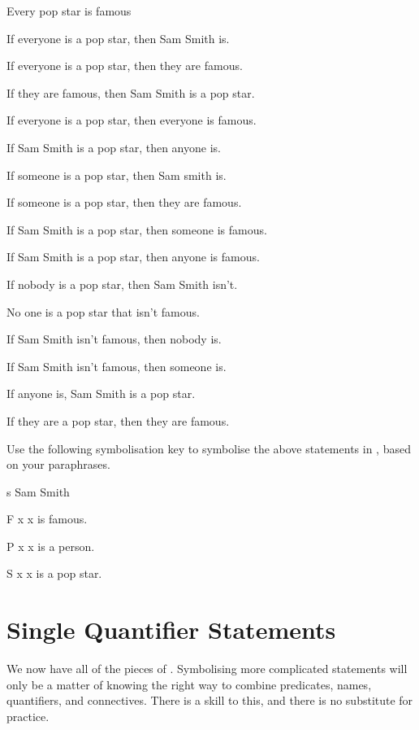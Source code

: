 \documentclass[PHIL101-Textbook.tex]{subfiles}
\begin{document}
\begin{earg}
\item Every pop star is famous 
\item If everyone is a pop star, then Sam Smith is.
\item If everyone is a pop star, then they are famous. 
\item If they are famous, then Sam Smith is a pop star.
\item If everyone is a pop star, then everyone is famous.
\item If Sam Smith is a pop star, then anyone is.
\item If someone is a pop star, then Sam smith is.
\item If someone is a pop star, then they are famous.
\item If Sam Smith is a pop star, then someone is famous.
\item If Sam Smith is a pop star, then anyone is famous. 
\item If nobody is a pop star, then Sam Smith isn't.
\item No one is a pop star that isn't famous.
\item If Sam Smith isn't famous, then nobody is.
\item If Sam Smith isn't famous, then someone is.
\item If anyone is, Sam Smith is a pop star. 
\item If they are a pop star, then they are famous. 
\end{earg}

\noindent\problempart
\label{pr.pl.symbol5}
Use the following symbolisation key to symbolise the above statements in \pl, based on your paraphrases. 
\begin{ekey}
\item[s] Sam Smith
\item[\atom F x ] x is famous.
\item[\atom P x ] x is a person.
  \item[\atom S x ] x is a pop star. 
\end{ekey}


\chapter{Single Quantifier Statements}
\label{ch:MoreMonadic}

We now have all of the pieces of \pl. Symbolising more complicated statements will only be a matter of knowing the right way to combine predicates, names, quantifiers, and connectives. There is a skill to this, and there is no substitute for practice.
\end{document}
